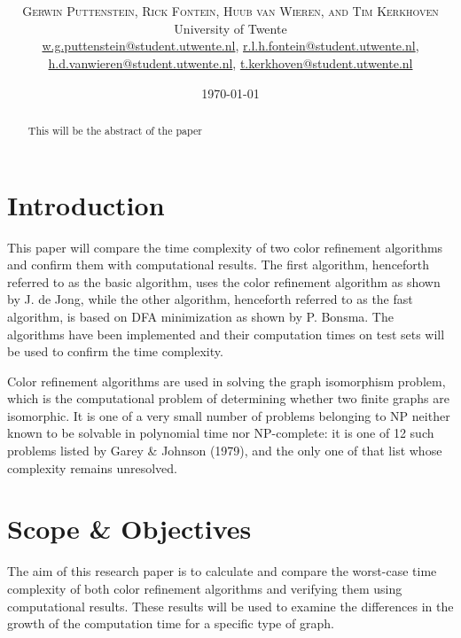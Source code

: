 \documentclass[twoside]{article}
\title{\vspace{-15mm}\fontsize{24pt}{10pt}\selectfont\textbf{\articletitle}} %
\author{
\large
\textsc{Gerwin Puttenstein, Rick Fontein, Huub van Wieren, and Tim Kerkhoven}\\[2mm] %
\normalsize University of Twente \\ %
\normalsize \href{mailto:w.g.puttenstein@student.utwente.nl}{w.g.puttenstein@student.utwente.nl}, 
\href{mailto:r.l.h.fontein@student.utwente.nl}{r.l.h.fontein@student.utwente.nl},\\
\normalsize \href{mailto:h.d.vanwieren@student.utwente.nl}{h.d.vanwieren@student.utwente.nl},
\href{mailto:t.kerkhoven@student.utwente.nl}{t.kerkhoven@student.utwente.nl}%
}
\date{\today}
\begin{document}
\thispagestyle{empty}
\maketitle %


\begin{abstract}

\noindent This will be the abstract of the paper

\end{abstract}


\begin{multicols}{2} %



\section{Introduction}
\label{intro}
This paper will compare the time complexity of two color refinement algorithms and confirm them with computational results. The first algorithm, henceforth referred to as the basic algorithm, uses the color refinement algorithm as shown by J. de Jong\cite{presentation:slidesPartI}, while the other algorithm, henceforth referred to as the fast algorithm, is based on DFA minimization as shown by P. Bonsma\cite{presentation:slidesPartIII}. The algorithms have been implemented and their computation times on test sets will be used to confirm the time complexity.

Color refinement algorithms are used in solving the graph isomorphism problem, which is the computational problem of determining whether two finite graphs are isomorphic. It is one of a very small number of problems belonging to NP neither known to be solvable in polynomial time nor NP-complete: it is one of 12 such problems listed by Garey \& Johnson (1979)\cite{book:gareyJohnson1979}, and the only one of that list whose complexity remains unresolved.\cite{website:wikiGI}

\section{Scope \& Objectives}
\label{scope}
The aim of this research paper is to calculate and compare the worst-case time complexity of both color refinement algorithms and verifying them using computational results. These results will be used to examine the differences in the growth of the computation time for a specific type of graph.


\end{multicols}
\end{document}
